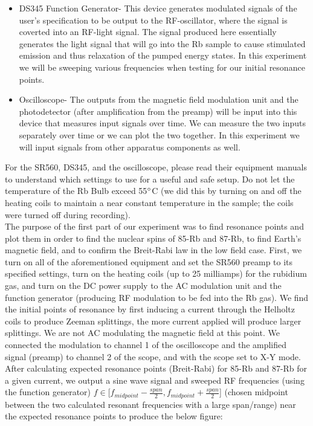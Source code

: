 \documentclass{article}
\begin{document}
\begin{itemize}
        \item DS345 Function Generator- This device generates modulated signals of the user's specification to be output to the RF-oscillator, where the signal is coverted into an RF-light signal. The signal produced here essentially generates the light signal that will go into the Rb sample to cause stimulated emission and thus relaxation of the pumped energy states. In this experiment we will be sweeping various frequencies when testing for our initial resonance points.
        \item Oscilloscope- The outputs from the magnetic field modulation unit and the photodetector (after amplification from the preamp) will be input into this device that measures input signals over time. We can measure the two inputs separately over time or we can plot the two together. In this experiment we will input signals from other apparatus components as well.
    \end{itemize}
    For the SR560, DS345, and the oscilloscope, please read their equipment manuals to understand which settings to use for a useful and safe setup. Do not let the temperature of the Rb Bulb exceed 55$\degree$C (we did this by turning on and off the heating coils to maintain a near constant temperature in the sample; the coils were turned off during recording). \\\indent The purpose of the first part of our experiment was to find resonance points and plot them in order to find the nuclear spins of 85-Rb and 87-Rb, to find Earth's magnetic field, and to confirm the Breit-Rabi law in the low field case. First, we turn on all of the aforementioned equipment and set the SR560 preamp to its specified settings, turn on the heating coils (up to 25 milliamps) for the rubidium gas, and turn on the DC power supply to the AC modulation unit and the function generator (producing RF modulation to be fed into the Rb gas). We find the initial points of resonance by first inducing a current through the Helholtz coils to produce Zeeman splittings, the more current applied will produce larger splittings. We are not AC modulating the magnetic field at this point. We connected the modulation to channel 1 of the oscilloscope and the amplified signal (preamp) to channel 2 of the scope, and with the scope set to X-Y mode. After calculating expected resonance points (Breit-Rabi) for 85-Rb and 87-Rb for a given current, we output a sine wave signal and sweeped RF frequencies (using the function generator) $f\in$[$f_{midpoint}-\frac{span}{2},f_{midpoint} + \frac{span}{2}$] (chosen midpoint between the two calculated resonant frequencies with a large span/range) near the expected resonance points to produce the below figure:
\end{document}
